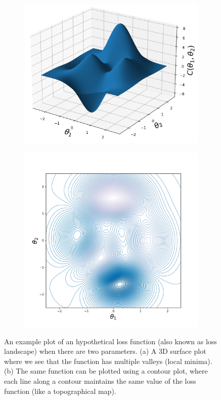 \documentclass[12pt]{article}
\begin{document}
\begin{figure}[h!] 
  \begin{subfigure}[b]{0.5\linewidth}
    \centering
    \includegraphics[width=0.87\linewidth, trim=30 30 30 30]{figures/Non-convex-3d.png}
    \caption{} 
    \vspace{2ex}
  \end{subfigure}%
  \begin{subfigure}[b]{0.5\linewidth}
    \centering
    \includegraphics[width=0.77\linewidth, trim=30 30 30 30]{figures/Non-convex-contour.pdf}
    \caption{} 
    \vspace{2ex}
  \end{subfigure} 
    \caption{An example plot of an hypothetical loss function (also known as loss landscape) when there are two parameters. (a) A 3D surface plot where we see that the function has multiple valleys (local minima). (b) The same function can be plotted using a contour plot, where each line along a contour maintains the same value of the loss function (like a topographical map).}
    \label{fig:GD-LR-SR}
\end{figure}
\end{document}
